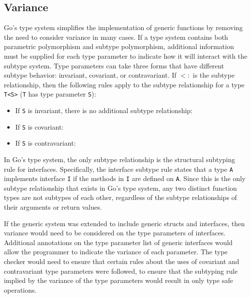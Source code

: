 \documentclass[letterpaper,11pt]{article}
\begin{document}
\subsection{Variance} \label{variance}

Go's type system simplifies the implementation of generic functions by removing the need to consider variance in many cases. If a type system contains both parametric polymorphism and subtype polymorphism, additional information must be supplied for each type parameter to indicate how it will interact with the subtype system. Type parameters can take three forms that have different subtype behavior: invariant, covariant, or contravariant. If $<:$ is the subtype relationship, then the following rules apply to the subtype relationship for a type \texttt{T<S>} (\texttt{T} has type parameter \texttt{S}):


\begin{itemize}
\item If \texttt{S} is invariant, there is no additional subtype relationship:
\begin{mathpar}
\end{mathpar}
\item If \texttt{S} is covariant:
\begin{mathpar}
\end{mathpar}

\item If \texttt{S} is contravariant:
\begin{mathpar}
\end{mathpar}
\end{itemize}

In Go's type system, the only subtype relationship is the structural subtyping rule for interfaces. Specifically, the interface subtype rule states that a type \texttt{A} implements interface \texttt{I} if the methods in \texttt{I} are defined on \texttt{A}. Since this is the only subtype relationship that exists in Go's type system, any two distinct function types are not subtypes of each other, regardless of the subtype relationships of their arguments or return values. 

If the generic system was extended to include generic structs and interfaces, then variance would need to be considered on the type parameters of interfaces. Additional annotations on the type parameter list of generic interfaces would allow the programmer to indicate the variance of each parameter. The type checker would need to ensure that certain rules about the uses of covariant and contravariant type parameters were followed, to ensure that the subtyping rule implied by the variance of the type parameters would result in only type safe operations.
\end{document}

